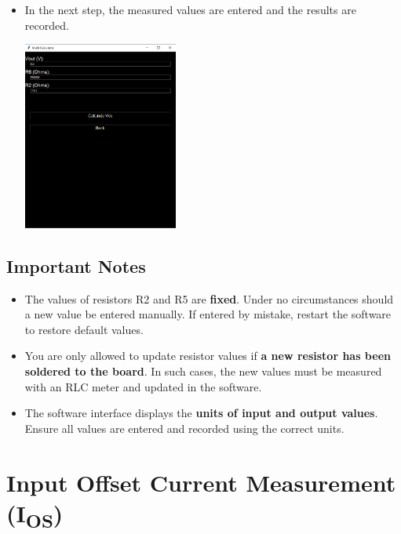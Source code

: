 \documentclass[a4paper,12pt]{article}
\begin{document}
\begin{itemize}
  \item In the next step, the measured values are entered and the results are recorded.

\begin{center}
  \includegraphics[width=0.4\textwidth]{IMAGEs/vos_software_setting.png}
\end{center}

\end{itemize}

\subsection*{Important Notes}

\begin{itemize}
  \item The values of resistors R2 and R5 are \textbf{fixed}. Under no circumstances should a new value be entered manually. If entered by mistake, restart the software to restore default values.

  \item You are only allowed to update resistor values if \textbf{a new resistor has been soldered to the board}. In such cases, the new values must be measured with an RLC meter and updated in the software.

  \item The software interface displays the \textbf{units of input and output values}. Ensure all values are entered and recorded using the correct units.
\end{itemize}

\newpage
\section{Input Offset Current Measurement (I\textsubscript{OS})}
\end{document}
